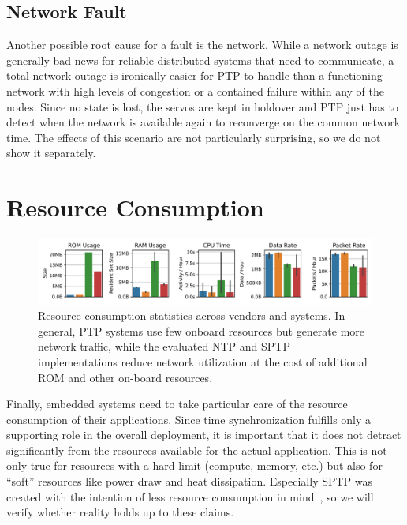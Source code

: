 \subsection{Network Fault}

Another possible root cause for a fault is the network. While a network outage is generally bad news for reliable distributed systems that need to communicate, a total network outage is ironically easier for PTP to handle than a functioning network with high levels of congestion or a contained failure within any of the nodes. Since no state is lost, the servos are kept in holdover and PTP just has to detect when the network is available again to reconverge on the common network time. The effects of this scenario are not particularly surprising, so we do not show it separately.


\section{Resource Consumption}
\label{sec:resource_consumption}

\begin{figure}
\centering
\includegraphics[width=\linewidth]{res/generated/resource_consumption/summary.pdf}
\legend
\caption{Resource consumption statistics across vendors and systems. In general, PTP systems use few onboard resources but generate more network traffic, while the evaluated NTP and SPTP implementations reduce network utilization at the cost of additional ROM and other on-board resources.}
\label{fig:resource_consumption}
\end{figure}

Finally, embedded systems need to take particular care of the resource consumption of their applications. Since time synchronization fulfills only a supporting role in the overall deployment, it is important that it does not detract significantly from the resources available for the actual application. This is not only true for resources with a hard limit (compute, memory, etc.) but also for ``soft'' resources like power draw and heat dissipation. Especially SPTP was created with the intention of less resource consumption in mind~\cite{sptp}, so we will verify whether reality holds up to these claims.

